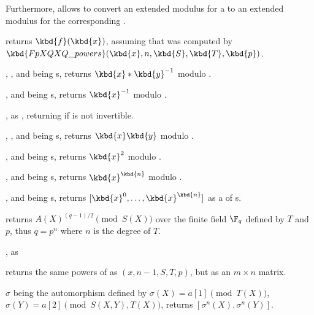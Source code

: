 Furthermore,  allows to convert an extended modulus for
a  to an extended modulus for the corresponding .


 returns
$\kbd{f}(\kbd{x})$, assuming that  was computed by
$\kbd{FpXQXQ\_powers}(\kbd{x}, n, \kbd{S}, \kbd{T}, \kbd{p})$.

, ,  and
 being s, returns $\kbd{x}*\kbd{y}^{-1}$ modulo .

,  and
 being s, returns $\kbd{x}^{-1}$ modulo .

, as ,
returning  if  is not invertible.

, ,  and
 being s, returns $\kbd{x}\*\kbd{y}$ modulo .

,  and
 being s, returns $\kbd{x}^2$ modulo .

,  and
 being s, returns $\kbd{x}^\kbd{n}$ modulo .

,  and
 being s, returns $[\kbd{x}^0, \dots, \kbd{x}^\kbd{n}]$ as a
 of s.

 returns
$A(X)^{(q-1)/2}\pmod{S(X)}$ over the finite field $\F_q$ defined by $T$
and $p$, thus $q=p^n$ where $n$ is the degree of $T$.

, as

returns the same powers of  as $(x, n-1,S, T, p)$,
but as an $m\times n$ matrix.

$\sigma$ being the automorphism defined by $\sigma(X)=a[1]\pmod{T(X)}$,
$\sigma(Y)=a[2]\pmod{S(X,Y),T(X)}$, returns $[\sigma^n(X),\sigma^n(Y)]$.

